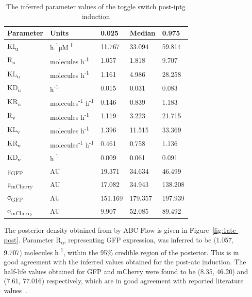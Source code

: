 \begin{table}[tb]
\centering
\caption{The inferred parameter values of the toggle switch post-\acrshort{iptg} induction}
\label{tab:inf_params_iptg}
\begin{tabular}{@{}lllll@{}}
\toprule
Parameter & Units &0.025 & Median & 0.975 \\ \midrule
KI\textsubscript{u} &h\textsuperscript{-1}μM\textsuperscript{-1}& 11.767 & 33.094 & 59.814 \\
R\textsubscript{u} & molecules h\textsuperscript{-1}& 1.057 & 1.818 & 9.707 \\
KL\textsubscript{u} &molecules h\textsuperscript{-1}& 1.161 & 4.986 & 28.258 \\
KD\textsubscript{u} &h\textsuperscript{-1}& 0.015 & 0.031 & 0.083 \\
KR\textsubscript{u} &molecules\textsuperscript{-1} h\textsuperscript{-1}& 0.146 & 0.839 & 1.183 \\
R\textsubscript{v} & molecules h\textsuperscript{-1}& 1.119 & 3.223 & 21.715 \\
KL\textsubscript{v} &molecules h\textsuperscript{-1}& 1.396 & 11.515 & 33.369 \\
KR\textsubscript{v} &molecules\textsuperscript{-1} h\textsuperscript{-1}& 0.461 & 0.758 & 1.136 \\
KD\textsubscript{v} &h\textsuperscript{-1}& 0.009 & 0.061 & 0.091 \\
μ\textsubscript{GFP} &AU& 19.371 & 34.634 & 46.499 \\
μ\textsubscript{mCherry} &AU& 17.082 & 34.943 & 138.208\\
σ\textsubscript{GFP} &AU& 151.169 & 179.357 & 197.939 \\
σ\textsubscript{mCherry} &AU& 9.907 & 52.085 & 89.492 \\ \bottomrule
\end{tabular}
\end{table}


The posterior density obtained from by ABC-Flow is given in Figure~\ref{fig:1atc-post}. Parameter R\textsubscript{u}, representing GFP expression, was inferred to be (1.057, 9.707) molecules h\textsuperscript{-1}, within the 95\% credible region of the posterior. This is in good agreement with the inferred values obtained for the post-\acrshort{atc} induction. The half-life values obtained for GFP and mCherry were found to be (8.35, 46.20) and (7.61, 77.016) respectively, which are in good agreement with reported literature values~\autocite{Shaner:2004vy, Andersen:1998tn}. 

